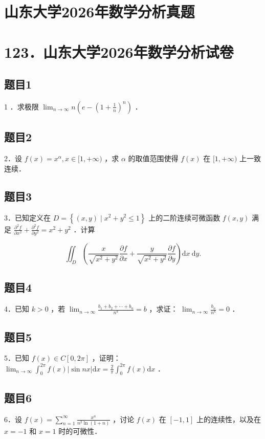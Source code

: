 \documentclass{article}
\begin{document}
\section*{山东大学2026年数学分析真题}
\section*{123．山东大学2026年数学分析试卷}

\subsection{题目1}
1 ．求极限 \(\lim _{n \rightarrow \infty} n\left(e-\left(1+\frac{1}{n}\right)^{n}\right)\) ．

\subsection{题目2}
2．设 \(f(x)=x^{\alpha}, x \in[1,+\infty)\) ，求 \(\alpha\) 的取值范围使得 \(f(x)\) 在 \([1,+\infty)\) 上一致连续．

\subsection{题目3}
3．已知定义在 \(D=\left\{(x, y) \mid x^{2}+y^{2} \leq 1\right\}\) 上的二阶连续可微函数 \(f(x, y)\) 满足 \(\frac{\partial^{2} f}{\partial x^{2}}+\frac{\partial^{2} f}{\partial y^{2}}=x^{2}+y^{2}\) ．计算

\[
\iint_{D}\left(\frac{x}{\sqrt{x^{2}+y^{2}}} \frac{\partial f}{\partial x}+\frac{y}{\sqrt{x^{2}+y^{2}}} \frac{\partial f}{\partial y}\right) \mathrm{d} x \mathrm{~d} y .
\]

\subsection{题目4}
4．已知 \(k>0\) ，若 \(\lim _{n \rightarrow \infty} \frac{b_{1}+b_{2}+\cdots+b_{n}}{n^{k}}=b\) ，求证： \(\lim _{n \rightarrow \infty} \frac{b_{n}}{n^{k}}=0\) ．

\subsection{题目5}
5．已知 \(f(x) \in C[0,2 \pi]\) ，证明： \(\lim _{n \rightarrow \infty} \int_{0}^{2 \pi} f(x)|\sin n x| \mathrm{d} x=\frac{2}{\pi} \int_{0}^{2 \pi} f(x) \mathrm{d} x\) ．

\subsection{题目6}
6．设 \(f(x)=\sum_{n=1}^{\infty} \frac{x^{n}}{n^{2} \ln (1+n)}\) ，讨论 \(f(x)\) 在 \([-1,1]\) 上的连续性，以及在 \(x=-1\) 和 \(x=1\) 时的可微性．
\end{document}
